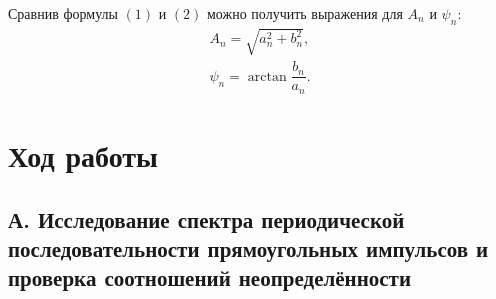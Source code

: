\documentclass[a4paper,12pt]{article}
\begin{document}
Сравнив формулы $(1)$ и $(2)$ можно получить выражения для $A_n$  и $\psi_n$:
\begin{equation}
\begin{array}{l}
A_n = \sqrt{a_n^2+b_n^2},\\
 \psi_n = \arctan \dfrac{b_n}{a_n}.
\end{array}
\end{equation}

\newpage

\section*{Ход работы}
\subsection*{А. Исследование спектра периодической последовательности
прямоугольных импульсов и проверка соотношений неопределённости}
\end{document}
